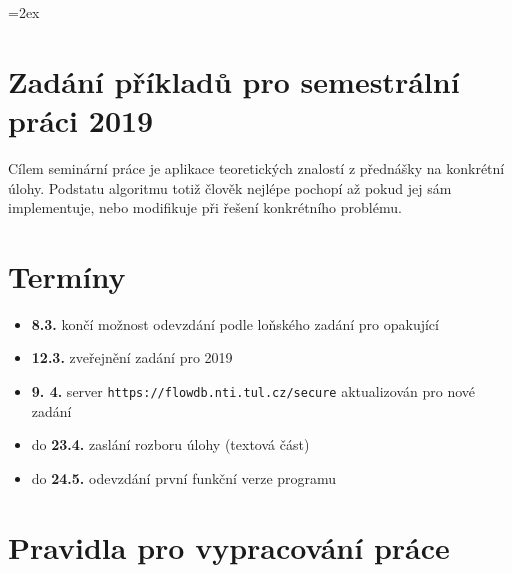 \documentclass[a4paper,10pt]{article}
\begin{document}
\parskip=2ex
\parindent=0pt
\pagestyle{empty}
 \section*{Zadání příkladů pro semestrální práci 2019}

 Cílem seminární práce je aplikace teoretických znalostí z přednášky na konkrétní úlohy.
 Podstatu algoritmu totiž člověk nejlépe pochopí až pokud jej sám implementuje, nebo modifikuje při řešení konkrétního problému.
 
 \section{Termíny}
 \begin{itemize}
  \item {\bf 8.3.} končí možnost odevzdání podle loňského zadání pro opakující
  \item {\bf 12.3.} zveřejnění zadání pro 2019
  \item {\bf 9. 4.} server \verb'https://flowdb.nti.tul.cz/secure' aktualizován pro nové zadání
  \item do {\bf 23.4.} zaslání rozboru úlohy (textová část)
  \item do {\bf 24.5.} odevzdání první funkční verze programu
 \end{itemize}

 \section{Pravidla pro vypracování práce}
\end{document}
